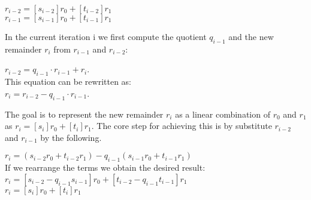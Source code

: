 \begin{infobox}
$r_{i - 2} = [s_{i-2}]r_0 +[t_{i-2}]r_1$\\
$r_{i-1} = [s_{i-1}]r_0 +[t_{i-1}]r_1$
\end{infobox}

\noindent
In the current iteration i we first compute the quotient $q_{i-1}$ and the new remainder $r_i$ from $r_{i-1}$ and $r_{i-2}$:

\begin{infobox}
$r_{i-2} = q_{i-1} \cdot r_{i-1}+r_i$.\\
This equation can be rewritten as:\\
$r_i = r_{i-2}-q_{i-1} \cdot r_{i-1}$.
\end{infobox}


\noindent
The goal is to represent the new remainder $r_i$ as a linear combination of $r_0$ and $r_1$ as $r_i = [s_i]r_0 +[t_i]r_1$. The core step for achieving this is by substitute $r_{i-2}$ and $r_{i-1}$ by the following.

\noindent
\begin{infobox}
$r_i = (s_{i-2}r_0+t_{i-2}r_1)-q_{i-1}(s_{i-1}r_0+t_{i-1}r_1)$\\
If we rearrange the terms we obtain the desired result:\\
$r_i = [s_{i-2}-q_{i-1}s_{i-1}]r_0 +[t_{i-2}-q_{i-1}t_{i-1}]r_1$\\
$r_i = [s_i]r_0 +[t_i]r_1$
\end{infobox}

